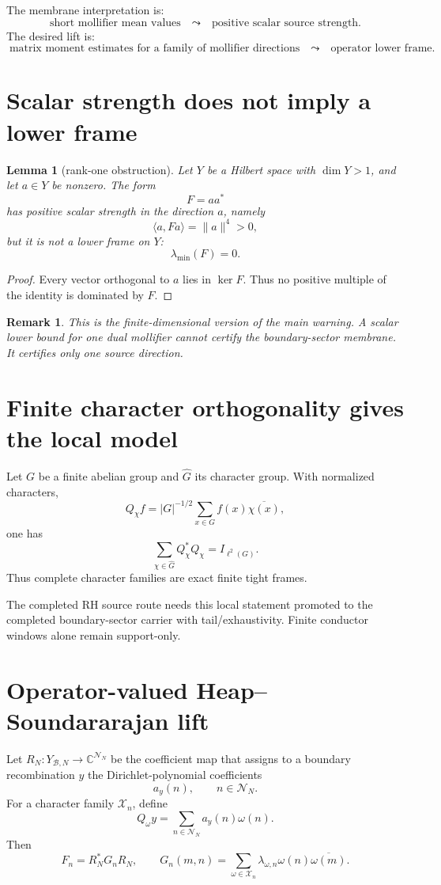 \documentclass[11pt]{article}
\newtheorem{lemma}{Lemma}
\newtheorem{remark}{Remark}
\newcommand{\cX}{\mathcal X}
\newcommand{\cB}{\mathcal B}
\newcommand{\cN}{\mathcal N}
\begin{document}
The membrane interpretation is:
\[
        \text{short mollifier mean values}
        \quad\leadsto\quad
        \text{positive scalar source strength.}
\]
The desired lift is:
\[
        \text{matrix moment estimates for a family of mollifier directions}
        \quad\leadsto\quad
        \text{operator lower frame.}
\]

\section{Scalar strength does not imply a lower frame}
\begin{lemma}[rank-one obstruction]
Let $Y$ be a Hilbert space with $\dim Y>1$, and let $a\in Y$ be nonzero.  The form
\[
        F=aa^*
\]
has positive scalar strength in the direction $a$, namely
\[
        \langle a,Fa\rangle=\|a\|^4>0,
\]
but it is not a lower frame on $Y$:
\[
        \lambda_{\min}(F)=0.
\]
\end{lemma}
\begin{proof}
Every vector orthogonal to $a$ lies in $\ker F$.  Thus no positive multiple of the identity is dominated by $F$.
\end{proof}

\begin{remark}
This is the finite-dimensional version of the main warning.  A scalar lower bound for one dual mollifier cannot certify the boundary-sector membrane.  It certifies only one source direction.
\end{remark}

\section{Finite character orthogonality gives the local model}
Let $G$ be a finite abelian group and $\widehat G$ its character group.  With normalized characters,
\[
        Q_\chi f=|G|^{-1/2}\sum_{x\in G}f(x)\overline{\chi(x)},
\]
one has
\[
        \sum_{\chi\in\widehat G}Q_\chi^*Q_\chi=I_{\ell^2(G)}.
\]
Thus complete character families are exact finite tight frames.

The completed RH source route needs this local statement promoted to the completed boundary-sector carrier with tail/exhaustivity.  Finite conductor windows alone remain support-only.

\section{Operator-valued Heap--Soundararajan lift}
Let $R_N:Y_{\cB,N}\to \mathbb C^{\cN_N}$ be the coefficient map that assigns to a boundary recombination $y$ the Dirichlet-polynomial coefficients
\[
        a_y(n),\qquad n\in\cN_N.
\]
For a character family $\cX_n$, define
\[
        Q_\omega y=\sum_{n\in\cN_N}a_y(n)\omega(n).
\]
Then
\[
        F_n=R_N^*G_nR_N,
        \qquad
        G_n(m,n)=\sum_{\omega\in\cX_n}\lambda_{\omega,n}\omega(n)\overline{\omega(m)}.
\]
\end{document}

